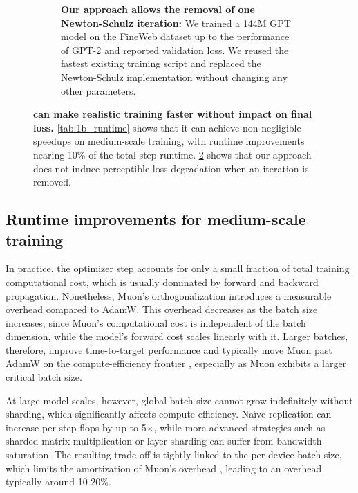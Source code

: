 \begin{figure}[t]
\begin{subfigure}[b]{0.49\textwidth}
\begin{tabular}{p{1mm} lll}
        \bottomrule
        \end{tabular}
        \vspace{6mm}
        \caption{\textbf{Our approach allows the removal of one Newton-Schulz iteration:} We trained a 144M GPT model on the FineWeb dataset\cite{penedo2024fineweb} up to the performance of GPT-2 and reported validation loss. We reused the fastest existing training script and replaced the Newton-Schulz implementation without changing any other parameters. %
        }
        \label{tab:nanoGPT_accuracy}
        \vspace{3.5mm}
    \end{subfigure}
    \caption{\textbf{\turbomuon can make realistic training faster without impact on final loss.} \cref{tab:1b_runtime} shows that it can achieve non-negligible speedups on medium-scale training, with runtime improvements nearing 10\% of the total step runtime. \cref{tab:nanoGPT_accuracy} shows that our approach does not induce perceptible loss degradation when an iteration is removed.}
\end{figure}

\begin{figure}[t]
    \centering
\end{figure}

\subsection{Runtime improvements for medium-scale training}
In practice, the optimizer step accounts for only a small fraction of total training computational cost, which is usually dominated by forward and backward propagation. Nonetheless, Muon’s orthogonalization introduces a measurable overhead compared to AdamW. This overhead decreases as the batch size increases, since Muon’s computational cost is independent of the batch dimension, while the model’s forward cost scales linearly with it. Larger batches, therefore, improve time-to-target performance and typically move Muon past AdamW on the compute-efficiency frontier \cite{shah2025practical}, especially as Muon exhibits a larger critical batch size\cite{wen_fantastic_2025}.

At large model scales, however, global batch size cannot grow indefinitely without sharding, which significantly affects compute efficiency. Naïve replication can increase per-step flops by up to 5×, while more advanced strategies such as sharded matrix multiplication or layer sharding can suffer from bandwidth saturation. The resulting trade-off is tightly linked to the per-device batch size, which limits the amortization of Muon’s overhead \cite{essential2025muon}, leading to an overhead typically around 10-20\%.


